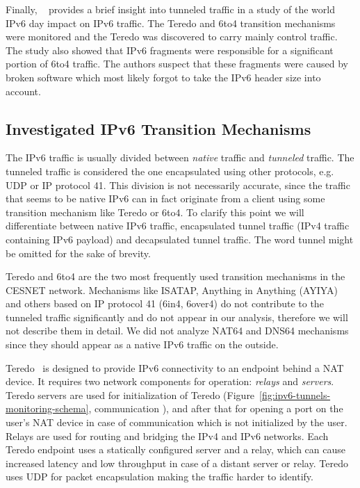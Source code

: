 Finally, \citeauthor{Sarrar-2012-Investigating}~\cite{Sarrar-2012-Investigating} provides a brief insight into tunneled traffic in a study of the world IPv6 day impact on IPv6 traffic. The Teredo and 6to4 transition mechanisms were monitored and the Teredo was discovered to carry mainly control traffic. The study also showed that IPv6 fragments were responsible for a significant portion of 6to4 traffic. The authors suspect that these fragments were caused by broken software which most likely forgot to take the IPv6 header size into account.

\subsection{Investigated IPv6 Transition Mechanisms} \label{subsec:ipv6-tunnel-traffic}

The IPv6 traffic is usually divided between \emph{native} traffic and \emph{tunneled} traffic. The tunneled traffic is considered the one encapsulated using other protocols, e.g. UDP or IP protocol 41. This division is not necessarily accurate, since the traffic that seems to be native IPv6 can in fact originate from a client using some transition mechanism like Teredo or 6to4. To clarify this point we will differentiate between native IPv6 traffic, encapsulated tunnel traffic (IPv4 traffic containing IPv6 payload) and decapsulated tunnel traffic. The word tunnel might be omitted for the sake of brevity. 

Teredo and 6to4 are the two most frequently used transition mechanisms in the CESNET network. Mechanisms like ISATAP, Anything in Anything (AYIYA) and others based on IP protocol 41 (6in4, 6over4) do not contribute to the tunneled traffic significantly and do not appear in our analysis, therefore we will not describe them in detail. We did not analyze NAT64 and DNS64 mechanisms since they should appear as a native IPv6 traffic on the outside.

Teredo~\cite{rfc4380} is designed to provide IPv6 connectivity to an endpoint behind a NAT device. It requires two network components for operation: \emph{relays} and \emph{servers}. Teredo servers are used for initialization of Teredo (Figure~\ref{fig:ipv6-tunnels-monitoring-schema}, communication ), and after that for opening a port on the user's NAT device in case of communication which is not initialized by the user. Relays are used for routing and bridging the IPv4 and IPv6 networks. Each Teredo endpoint uses a statically configured server and a relay, which can cause increased latency and low throughput in case of a distant server or relay. Teredo uses UDP for packet encapsulation making the traffic harder to identify.

